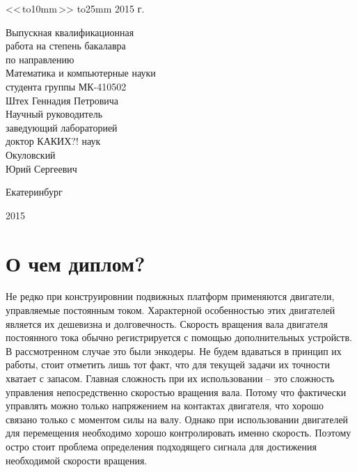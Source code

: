 \documentclass[14pt]{extreport}
\begin{document}
\begin{titlepage}
{\begin{parbox}[t]{9cm}
{                <<\,\hbox to10mm{\hrulefill}\,>>  \hbox to25mm{\hrulefill}  2015 г.
            }
            \end{parbox}
            \begin{parbox}[t]{9cm}{\small  {}
                Выпускная квалификационная \\
                работа на степень бакалавра\\
                 по направлению\\
                Математика и компьютерные науки\\
                студента группы МК-410502 \\
                Штех Геннадия Петровича\\
                \medskip
                Научный руководитель\\
                заведующий лабораторией\\
                доктор КАКИХ?! наук \\
                Окуловский  \\
                Юрий Сергеевич\\
            }
            \end{parbox}

        \vfill
        \centerline{Екатеринбург}
        \centerline{2015}
        }\restoregeometry
    \end{titlepage}

\newpage
    \tableofcontents


\newpage
    \chapter{О чем диплом?}
        Не редко при конструировнии подвижных платформ применяются двигатели, управляемые постоянным током. Характерной особенностью этих двигателей является их дешевизна и долговечность. Скорость вращения вала двигателя постоянного тока обычно регистрируется с помощью дополнительных устройств. В рассмотренном случае это были энкодеры. Не будем вдаваться в принцип их работы, стоит отметить лишь тот факт, что для текущей задачи их точности хватает с запасом. Главная сложность при их использовании -- это сложность управления непосредственно скоростью вращения вала. Потому что фактически управлять можно только напряжением на контактах двигателя, что хорошо связано только с моментом силы на валу. Однако при использовании двигателей для перемещения необходимо хорошо контролировать именно скорость. Поэтому остро стоит проблема определения подходящего сигнала для достижения необходимой скорости вращения.
\end{document}
